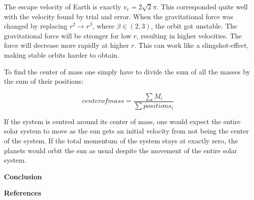 \documentclass[10pt,a4paper]{article}
\begin{document}
\noindent The escape velocity of Earth is exactly $v_e=2\sqrt{2}\pi$. This corresponded quite well with the velocity found by trial and error. When the gravitational force was changed by replacing $r^2\rightarrow r^\beta$, where $\beta \in(2,3)$, the orbit got unstable. The gravitational force will be stronger for low $r$, resulting in higher velocities. The force will decrease more rapidly at higher $r$. This can work like a slingshot-effect, making stable orbits harder to obtain.  

\noindent To find the center of mass one simply have to divide the sum of all the masses by the sum of their positions: 


$$center of mass = \frac{\sum M_i}{\sum positions_i} $$

\noindent If the system is centred around its center of mass, one would expect the entire solar system to move as the sun gets an initial velocity from not being the center of the system. If the total momentum of the system stays at exactly zero, the planets would orbit the sun as usual despite the movement of the entire solar system.



\newpage
{\LARGE\bf
Conclusion
}









\newpage
{\LARGE\bf
References
}
\end{document}
